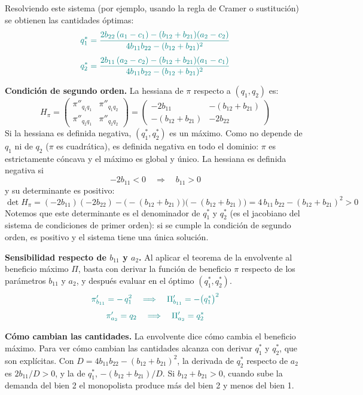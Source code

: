 \documentclass{article}
\begin{document}
Resolviendo este sistema (por ejemplo, usando la regla de Cramer o sustitución) se obtienen las cantidades óptimas:
\[\color{teal}
q_1^*=\frac{2b_{22}\,(a_1-c_1)-(b_{12}+b_{21})(a_2-c_2)}{4b_{11}b_{22}-(b_{12}+b_{21})^2}
\]
\[\color{teal}
q_2^*=\frac{2b_{11}\,(a_2-c_2)-(b_{12}+b_{21})(a_1-c_1)}{4b_{11}b_{22}-(b_{12}+b_{21})^2}
\]

\textbf{Condición de segundo orden.} La hessiana de \(\pi\) respecto a \((q_1,q_2)\) es:
\[
H_\pi
=
\begin{pmatrix}
\pi''_{q_1q_1} & \pi''_{q_1q_2}\\[0.5em]
\pi''_{q_2q_1} & \pi''_{q_2q_2}
\end{pmatrix}
=
\begin{pmatrix}
-2b_{11} & -(b_{12}+b_{21})\\[0.5em]
-(b_{12}+b_{21}) & -2b_{22}
\end{pmatrix}
\]
Si la hessiana es definida negativa, \((q_1^*,q_2^*)\) es un máximo. Como no depende de \(q_1\) ni de \(q_2\) (\(\pi\) es cuadrática), es definida negativa en todo el dominio: \(\pi\) es estrictamente cóncava y el máximo es global y único. La hessiana es definida negativa si
\[
-2b_{11}<0
\quad\Longrightarrow\quad
b_{11}>0
\]
y su determinante es positivo:
\[
\det H_\pi
=(-2b_{11})(-2b_{22})-\bigl(-(b_{12}+b_{21})\bigr)\bigl(-(b_{12}+b_{21})\bigr)
=4\,b_{11}\,b_{22}-(b_{12}+b_{21})^2
>0
\]
Notemos que este determinante es el denominador de \(q_1^*\) y \(q_2^*\) (es el jacobiano del sistema de condiciones de primer orden): si se cumple la condición de segundo orden, es positivo y el sistema tiene una única solución.

\textbf{Sensibilidad respecto de \(b_{11}\) y \(a_2\).} Al aplicar el teorema de la envolvente al beneficio máximo \(\Pi\), basta con derivar la función de beneficio \(\pi\) respecto de los parámetros \(b_{11}\) y \(a_2\), y después evaluar en el óptimo \((q_1^*,q_2^*)\).
\[\color{teal}
\pi'_{b_{11}}=-\,q_1^2
\quad\Longrightarrow\quad
\Pi'_{b_{11}}=-\bigl(q_1^*\bigr)^2
\]
\[\color{teal}
\pi'_{a_2}=q_2
\quad\Longrightarrow\quad
\Pi'_{a_2}=q_2^*
\]

\textbf{Cómo cambian las cantidades.} La envolvente dice cómo cambia el beneficio máximo. Para ver cómo cambian las cantidades alcanza con derivar \(q_1^*\) y \(q_2^*\), que son explícitas. Con \(D=4b_{11}b_{22}-(b_{12}+b_{21})^2\), la derivada de \(q_2^*\) respecto de \(a_2\) es \(2b_{11}/D>0\), y la de \(q_1^*\), \(-(b_{12}+b_{21})/D\). Si \(b_{12}+b_{21}>0\), cuando sube la demanda del bien 2 el monopolista produce más del bien 2 y menos del bien 1.
\end{document}
